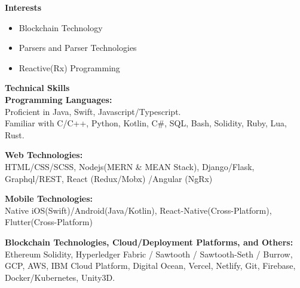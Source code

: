 \documentclass{article}
\begin{document}
\noindent \large \textbf{\textcolor{NavyBlue}{Interests}}
\begin{itemize}[noitemsep,nolistsep,leftmargin=*]
    \item {\normalsize Blockchain Technology}
    \item {\normalsize Parsers and Parser Technologies}
    \item {\normalsize Reactive(Rx) Programming}
\end{itemize}
\vspace{10pt}
\noindent \large \textbf{\textcolor{NavyBlue}{Technical Skills}} \vspace{5pt} \\
\noindent \normalsize \textbf{Programming Languages:} \\
\noindent \normalsize Proficient in Java, Swift, Javascript/Typescript. \\
\noindent \normalsize Familiar with C/C++, Python, Kotlin, C\#, SQL, Bash, Solidity, Ruby, Lua, Rust.
\vspace{5pt}

\noindent \normalsize \textbf{Web Technologies:} \\
\noindent \normalsize HTML/CSS/SCSS, Nodejs(MERN \& MEAN Stack), Django/Flask, Graphql/REST, React
(Redux/Mobx) /Angular (NgRx)
\vspace{5pt}

\noindent \normalsize \textbf{Mobile Technologies:} \\
\noindent \normalsize Native iOS(Swift)/Android(Java/Kotlin), React-Native(Cross-Platform), Flutter(Cross-Platform)
\vspace{5pt}

\noindent \normalsize \textbf{Blockchain Technologies, Cloud/Deployment Platforms, and Others:}\\
\noindent \normalsize Ethereum Solidity, Hyperledger Fabric / Sawtooth / Sawtooth-Seth / Burrow, GCP, AWS, IBM Cloud Platform, Digital Ocean, Vercel, Netlify, Git, Firebase, Docker/Kubernetes, Unity3D.
\end{document}
